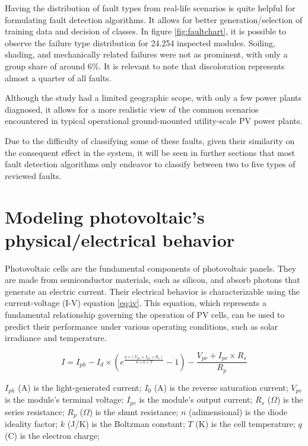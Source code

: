 Having the distribution of fault types from real-life scenarios is quite helpful for formulating fault detection algorithms. It allows for better generation/selection of training data and decision of classes. In figure \ref{fig:faultchart}, it is possible to observe the failure type distribution for 24.254 inspected modules. Soiling, shading, and mechanically related failures were not as prominent, with only a group share of around 6\%. It is relevant to note that discoloration represents almost a quarter of all faults.

Although the study had a limited geographic scope, with only a few power plants diagnosed, it allows for a more realistic view of the common scenarios encountered in typical operational ground-mounted utility-scale PV power plants.

Due to the difficulty of classifying some of these faults, given their similarity on the consequent effect in the system, it will be seen in further sections that most fault detection algorithms only endeavor to classify between two to five types of reviewed faults.

\section{Modeling photovoltaic's physical/electrical behavior}

Photovoltaic cells are the fundamental components of photovoltaic panels. They are made from semiconductor materials, such as silicon,  and absorb photons that generate an electric current. Their electrical behavior is characterizable using the current-voltage (I-V) equation \ref{eq:iv}. This equation, which represents a fundamental relationship governing the operation of PV cells, can be used to predict their performance under various operating conditions, such as solar irradiance and temperature.

\begin{equation} \label{eq:iv}
    I = I_{ph} - I_d \times (e^{\frac{q \times (V_{pv} + I_{pv} \times R_{s})}{n \times k \times T}} - 1) - \frac{V_{pv} + I_{pv} \times R_s}{R_p}
\end{equation}

$I_{ph}$ (A) is the light-generated current;
$I_{0}$ (A) is the reverse saturation current;
$V_{pv}$ is the module's terminal voltage;
$I_{pv}$ is the module's output current;
$R_{s}$ ($\Omega$) is the series resistance;
$R_{p}$ ($\Omega$) is the shunt resistance;
$n$ (adimensional) is the diode ideality factor;
$k$ (J/K) is the Boltzman constant;
$T$ (K) is the cell temperature;
$q$ (C) is the electron charge;

